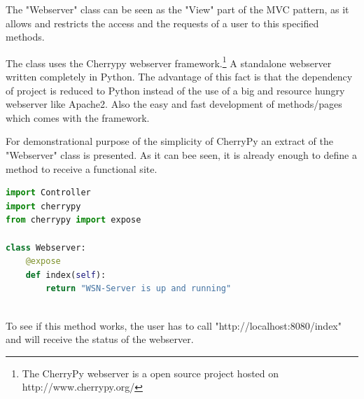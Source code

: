 The "Webserver" class can be seen as the "View" part of the MVC pattern, as it allows and restricts the access and the requests of a user to this specified methods.

The class uses the Cherrypy webserver framework.\footnote{The CherryPy webserver is a open source project hosted on http://www.cherrypy.org/} A standalone webserver written completely in Python. The advantage of this fact is that the dependency of project is reduced to Python instead of the use of a big and resource hungry webserver like Apache2. Also the easy and fast development of methods/pages which comes with the framework.

For demonstrational purpose of the simplicity of CherryPy an extract of the "Webserver" class is presented. As it can bee seen, it is already enough to define a method to receive a functional site. 
\begin{lstlisting}[language=Python]
import Controller
import cherrypy
from cherrypy import expose

class Webserver:
    @expose
    def index(self):
        return "WSN-Server is up and running"
       
\end{lstlisting}

To see if this method works, the user has to call "http://localhost:8080/index" and will receive the status of the webserver.



